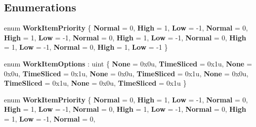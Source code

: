 \subsection*{Enumerations}
\begin{DoxyCompactItemize}
\item 
\mbox{\label{namespace_windows_1_1_system_1_1_threading_a6d436d8ad69b6001b82160043badf06a}} 
enum {\bfseries Work\+Item\+Priority} \{ \newline
{\bfseries Normal} = 0, 
{\bfseries High} = 1, 
{\bfseries Low} = -\/1, 
{\bfseries Normal} = 0, 
\newline
{\bfseries High} = 1, 
{\bfseries Low} = -\/1, 
{\bfseries Normal} = 0, 
{\bfseries High} = 1, 
\newline
{\bfseries Low} = -\/1, 
{\bfseries Normal} = 0, 
{\bfseries High} = 1, 
{\bfseries Low} = -\/1, 
\newline
{\bfseries Normal} = 0, 
{\bfseries High} = 1, 
{\bfseries Low} = -\/1
 \}
\item 
\mbox{\label{namespace_windows_1_1_system_1_1_threading_a94947e61a137a08a7882cdb6eb9afa18}} 
enum {\bfseries Work\+Item\+Options} \+: uint \{ \newline
{\bfseries None} = 0x0u, 
{\bfseries Time\+Sliced} = 0x1u, 
{\bfseries None} = 0x0u, 
{\bfseries Time\+Sliced} = 0x1u, 
\newline
{\bfseries None} = 0x0u, 
{\bfseries Time\+Sliced} = 0x1u, 
{\bfseries None} = 0x0u, 
{\bfseries Time\+Sliced} = 0x1u, 
\newline
{\bfseries None} = 0x0u, 
{\bfseries Time\+Sliced} = 0x1u
 \}
\item 
\mbox{\label{namespace_windows_1_1_system_1_1_threading_a6d436d8ad69b6001b82160043badf06a}} 
enum {\bfseries Work\+Item\+Priority} \{ \newline
{\bfseries Normal} = 0, 
{\bfseries High} = 1, 
{\bfseries Low} = -\/1, 
{\bfseries Normal} = 0, 
\newline
{\bfseries High} = 1, 
{\bfseries Low} = -\/1, 
{\bfseries Normal} = 0, 
{\bfseries High} = 1, 
\newline
{\bfseries Low} = -\/1, 
{\bfseries Normal} = 0, 
{\bfseries High} = 1, 
{\bfseries Low} = -\/1, 
\newline
{\bfseries Normal} = 0, 

\end{DoxyCompactItemize}
